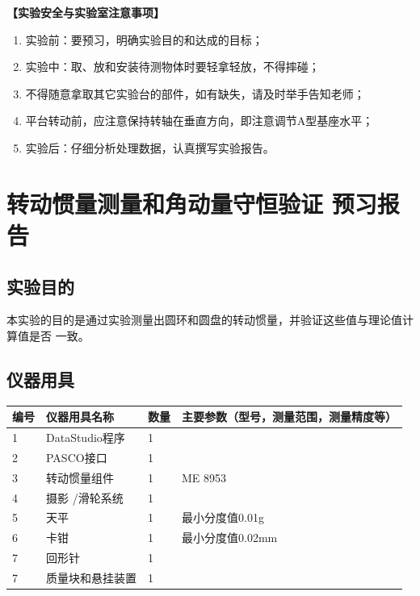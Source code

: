 \documentclass[dvipsnames, svgnames,a4paper,11pt]{article}
\begin{document}
{\textbf{【实验安全与实验室注意事项】}
\begin{enumerate}
	\item 实验前：要预习，明确实验目的和达成的目标；
	\item 实验中：取、放和安装待测物体时要轻拿轻放，不得摔碰；
	\item 不得随意拿取其它实验台的部件，如有缺失，请及时举手告知老师；
    \item 平台转动前，应注意保持转轴在垂直方向，即注意调节A型基座水平；
    \item 实验后：仔细分析处理数据，认真撰写实验报告。
    
\end{enumerate}}

\clearpage
\tableofcontents
\clearpage

\setcounter{section}{0}
\section{转动惯量测量和角动量守恒验证 \textbf{预习报告}}
	
\subsection{实验目的}
本实验的目的是通过实验测量出圆环和圆盘的转动惯量，并验证这些值与理论值计算值是否
一致。

\subsection{仪器用具}
\begin{table}[htbp]
	\centering
	\renewcommand\arraystretch{1.6}
	\begin{tabular}{p{}|p{}|p{}|p{}}
	\hline
	编号& 仪器用具名称 & 数量 &  主要参数（型号，测量范围，测量精度等） \\
	\hline
	1&DataStudio程序&1 &\\
	\hline
	2&PASCO接口&1&\\
	\hline
	3&转动惯量组件& 1 &ME 8953 \\
	\hline
	4&摄影 /滑轮系统&1 &  \\
	\hline
	5&天平&1 &最小分度值0.01g  \\
	\hline
	6&卡钳&1 &最小分度值0.02mm \\
	\hline
	7&回形针&1 & \\
	\hline
	7&质量块和悬挂装置&1 & \\
	\hline
\end{tabular}
\end{table}
\end{document}

